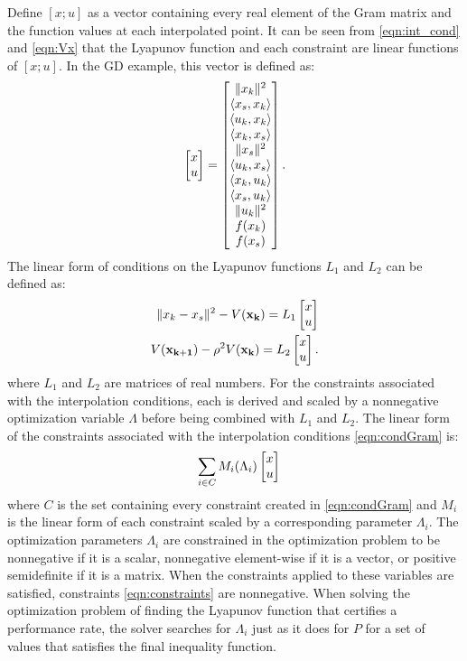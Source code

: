 Define $[x; u]$ as a vector containing every real element of the Gram matrix and the function values at each interpolated point. It can be seen from \eqref{eqn:int_cond} and \eqref{eqn:Vx} that the Lyapunov function and each constraint are linear functions of $[x; u]$. In the GD example, this vector is defined as:
\begin{equation} \label{eqn:xu}
	\begin{bmatrix}x\\ u\end{bmatrix} = \begin{bmatrix}\|x_k\|^2 \\ \langle x_s, x_k \rangle \\ \langle u_k, x_k \rangle \\ \langle x_k, x_s \rangle \\ \|x_s\|^2 \\ \langle u_k, x_s \rangle \\ \langle x_k, u_k \rangle \\ \langle x_s, u_k \rangle \\ \|u_k\|^2 \\ f(x_k) \\ f(x_s)\end{bmatrix}.
\end{equation}
The linear form of conditions on the Lyapunov functions $L_1$ and $L_2$ can be defined as:
\begin{subequations}
	\begin{align}
		\|x_k - x_s\|^2 - V(\mathbf{x_k}) = L_1\begin{bmatrix}x\\ u\end{bmatrix}\\
		V(\mathbf{x_{k+1}}) - \rho ^2V(\mathbf{x_k}) = L_2\begin{bmatrix}x\\ u\end{bmatrix}.
	\end{align}
\end{subequations}
where $L_1$ and $L_2$ are matrices of real numbers. For the constraints associated with the interpolation conditions, each is derived and scaled by a nonnegative optimization variable $\Lambda$ before being combined with $L_1$ and $L_2$. The linear form of the constraints associated with the interpolation conditions \eqref{eqn:condGram} is:
\begin{equation} \label{eqn:constraints}
    \sum_{i \in C}M_i(\Lambda_i)\bmat{x\\u}
\end{equation}
where $C$ is the set containing every constraint created in \eqref{eqn:condGram} and $M_i$ is the linear form of each constraint scaled by a corresponding parameter $\Lambda _i$. The optimization parameters $\Lambda _i$ are constrained in the optimization problem to be nonnegative if it is a scalar, nonnegative element-wise if it is a vector, or positive semidefinite if it is a matrix. When the constraints applied to these variables are satisfied, constraints \eqref{eqn:constraints} are nonnegative. When solving the optimization problem of finding the Lyapunov function that certifies a performance rate, the solver searches for $\Lambda _i$ just as it does for $P$ for a set of values that satisfies the final inequality function. 

